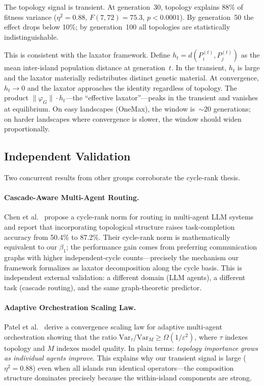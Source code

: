 The topology signal is transient.  At generation~30, topology explains
88\% of fitness variance ($\eta^2 = 0.88$, $F(7,72) = 75.3$,
$p < 0.0001$).  By generation~50 the effect drops below 10\%; by
generation~100 all topologies are statistically indistinguishable.

This is consistent with the laxator framework.  Define
$h_t = d(P_i^{(t)}, P_j^{(t)})$ as the mean inter-island population
distance at generation~$t$.  In the transient, $h_t$ is large and the
laxator materially redistributes distinct genetic material.  At
convergence, $h_t \to 0$ and the laxator approaches the identity
regardless of topology.  The product $\|\varphi_G\| \cdot h_t$---the
``effective laxator''---peaks in the transient and vanishes at
equilibrium.  On easy landscapes (OneMax), the window is~${\sim}20$
generations; on harder landscapes where convergence is slower, the
window should widen proportionally.


\subsection{Independent Validation}
\label{sec:independent}

Two concurrent results from other groups corroborate the cycle-rank
thesis.

\paragraph{Cascade-Aware Multi-Agent Routing.}
Chen et al.~\cite{chen2026cascade} propose a cycle-rank norm for
routing in multi-agent LLM systems and report that incorporating
topological structure raises task-completion accuracy from 50.4\% to
87.2\%.  Their cycle-rank norm is mathematically equivalent to our
$\beta_1$; the performance gain comes from preferring communication
graphs with higher independent-cycle counts---precisely the mechanism
our framework formalizes as laxator decomposition along the cycle
basis.  This is independent external validation: a different domain
(LLM agents), a different task (cascade routing), and the same
graph-theoretic predictor.

\paragraph{Adaptive Orchestration Scaling Law.}
Patel et al.~\cite{patel2026adaptorch} derive a convergence scaling
law for adaptive multi-agent orchestration showing that the ratio
$\mathrm{Var}_\tau / \mathrm{Var}_M \geq \Omega(1/\varepsilon^2)$,
where $\tau$ indexes topology and $M$ indexes model quality.  In
plain terms: \emph{topology importance grows as individual agents
improve}.  This explains why our transient signal is large ($\eta^2
= 0.88$) even when all islands run identical operators---the
composition structure dominates precisely because the within-island
components are strong.


